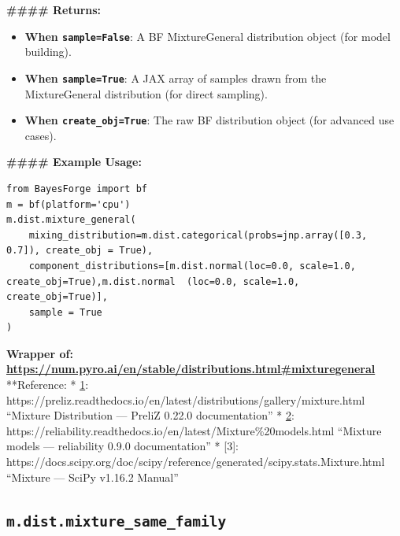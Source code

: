 \documentclass[
  letterpaper,
  DIV=11,
  numbers=noendperiod]{scrartcl}
\providecommand{\tightlist}{%
  \setlength{\itemsep}{0pt}\setlength{\parskip}{0pt}}\usepackage{longtable,booktabs,array}
\begin{document}
\textbf{\#\#\#\# Returns:}

\begin{itemize}
\tightlist
\item
  \textbf{When \texttt{sample=False}}: A BF MixtureGeneral distribution
  object (for model building).
\item
  \textbf{When \texttt{sample=True}}: A JAX array of samples drawn from
  the MixtureGeneral distribution (for direct sampling).
\item
  \textbf{When \texttt{create\_obj=True}}: The raw BF distribution
  object (for advanced use cases).
\end{itemize}

\textbf{\#\#\#\# Example Usage:}

\begin{verbatim}
from BayesForge import bf
m = bf(platform='cpu')
m.dist.mixture_general(
    mixing_distribution=m.dist.categorical(probs=jnp.array([0.3, 0.7]), create_obj = True),     
    component_distributions=[m.dist.normal(loc=0.0, scale=1.0, create_obj=True),m.dist.normal  (loc=0.0, scale=1.0,  create_obj=True)],
    sample = True
)           
\end{verbatim}

\textbf{Wrapper of:
\url{https://num.pyro.ai/en/stable/distributions.html\#mixturegeneral}}
**Reference: *\emph{ }
\href{https://en.wikipedia.org/wiki/Matrix_normal_distribution}{1}:
https://preliz.readthedocs.io/en/latest/distributions/gallery/mixture.html
``Mixture Distribution --- PreliZ 0.22.0 documentation'' *
\href{https://statproofbook.github.io/P/matn-pdf.html}{2}:
https://reliability.readthedocs.io/en/latest/Mixture\%20models.html
``Mixture models --- reliability 0.9.0 documentation'' * {[}3{]}:
https://docs.scipy.org/doc/scipy/reference/generated/scipy.stats.Mixture.html
``Mixture --- SciPy v1.16.2 Manual''

\subsection{\texorpdfstring{\texttt{m.dist.mixture\_same\_family}}{m.dist.mixture\_same\_family}}\label{mixture_same_family}
\end{document}
